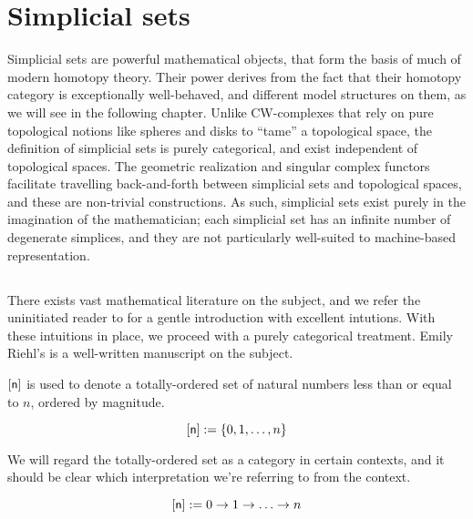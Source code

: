 \documentclass[10pt]{art}
\begin{document}
\section{Simplicial sets}
Simplicial sets are powerful mathematical objects, that form the basis of much of modern homotopy theory. Their power derives from the fact that their homotopy category is exceptionally well-behaved, and different model structures on them, as we will see in the following chapter. Unlike CW-complexes that rely on pure topological notions like spheres and disks to ``tame'' a topological space, the definition of simplicial sets is purely categorical, and exist independent of topological spaces. The geometric realization and singular complex functors facilitate travelling back-and-forth between simplicial sets and topological spaces, and these are non-trivial constructions. As such, simplicial sets exist purely in the imagination of the mathematician; each simplicial set has an infinite number of degenerate simplices, and they are not particularly well-suited to machine-based representation.

\subsection{\texorpdfstring{\SSet}{The category of simplicial sets}}
There exists vast mathematical literature on the subject, and we refer the uninitiated reader to \cite{Friedman08} for a gentle introduction with excellent intutions. With these intuitions in place, we proceed with a purely categorical treatment. Emily Riehl's \cite{Riehl11} is a well-written manuscript on the subject.

\begin{definition}[\sq{n}]
  $\mathsf{[n]}$ is used to denote a totally-ordered set of natural numbers less than or equal to $n$, ordered by magnitude.

  \begin{equation*}
    \mathsf{[n]} := \{0, 1, \ldots, n\}
  \end{equation*}

  We will regard the totally-ordered set as a category in certain contexts, and it should be clear which interpretation we're referring to from the context.

  \begin{equation*}
    \mathsf{[n]} := 0 \rightarrow 1 \rightarrow \ldots \rightarrow n
  \end{equation*}
\end{definition}
\end{document}
